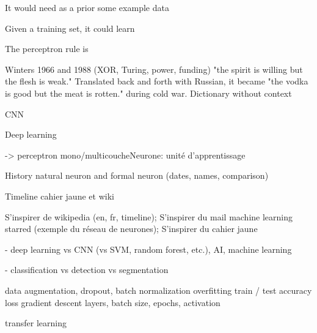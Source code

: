 






It would need as a prior some example data

Given a training set, it could learn

The perceptron rule is 










Winters 1966 and 1988 (XOR, Turing, power, funding)
"the spirit is willing but the flesh is weak." Translated back and forth with Russian, it became "the vodka is good but the meat is rotten." during cold war. Dictionary without context

CNN

Deep learning

-> perceptron mono/multicoucheNeurone: unité d'apprentissage



History natural neuron and formal neuron (dates, names, comparison)

Timeline cahier jaune et wiki

S'inspirer de wikipedia (en, fr, timeline); 
S'inspirer du mail machine learning starred (exemple du réseau de neurones); 
S'inspirer du cahier jaune


- deep learning vs CNN (vs SVM, random forest, etc.), AI, machine learning

- classification vs detection vs segmentation

data augmentation, dropout, batch normalization
overfitting
train / test
accuracy loss
gradient descent
layers, batch size, epochs, activation

transfer learning

